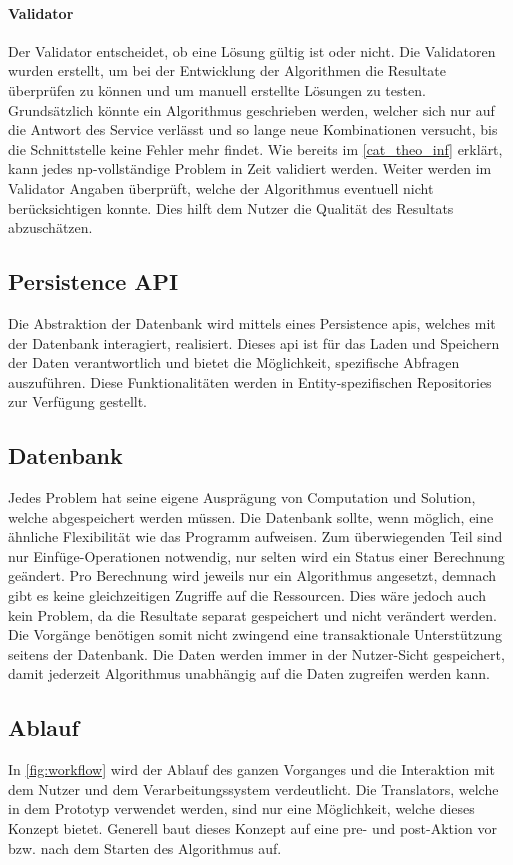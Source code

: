 \paragraph{Validator}
Der Validator entscheidet, ob eine Lösung gültig ist oder nicht. Die Validatoren wurden erstellt, um bei der Entwicklung der Algorithmen die Resultate überprüfen zu können und um manuell 
erstellte Lösungen zu testen. Grundsätzlich könnte ein Algorithmus geschrieben werden, welcher sich nur auf die Antwort des Service verlässt und so lange neue Kombinationen versucht, 
bis die Schnittstelle keine Fehler mehr findet. Wie bereits im \autoref{cat_theo_inf} erklärt, kann jedes \gls{np}-vollständige Problem in  Zeit validiert 
werden. Weiter werden im Validator Angaben überprüft, welche der Algorithmus eventuell nicht berücksichtigen konnte. Dies hilft dem Nutzer die Qualität des Resultats abzuschätzen.

\subsection{Persistence API}
Die Abstraktion der Datenbank wird mittels eines Persistence \glspl{api}, welches mit der Datenbank interagiert, realisiert. Dieses \gls{api} ist für das Laden und Speichern der Daten 
verantwortlich und bietet die Möglichkeit, spezifische Abfragen auszuführen. Diese Funktionalitäten werden in Entity-spezifischen Repositories zur Verfügung gestellt.

\subsection{Datenbank}
Jedes Problem hat seine eigene Ausprägung von Computation und Solution, welche abgespeichert werden müssen. Die Datenbank sollte, wenn möglich, eine ähnliche Flexibilität wie 
das Programm aufweisen. Zum überwiegenden Teil sind nur Einfüge-Operationen notwendig, nur selten wird ein Status einer Berechnung geändert. Pro Berechnung wird jeweils nur ein 
Algorithmus angesetzt, demnach gibt es keine gleichzeitigen Zugriffe auf die Ressourcen. Dies wäre jedoch auch kein Problem, da die Resultate separat gespeichert und nicht verändert 
werden. Die Vorgänge benötigen somit nicht zwingend eine transaktionale Unterstützung seitens der Datenbank. Die Daten werden immer in der Nutzer-Sicht gespeichert, damit jederzeit 
Algorithmus unabhängig auf die Daten zugreifen werden kann.

\newpage
\subsection{Ablauf}
In \autoref{fig:workflow} wird der Ablauf des ganzen Vorganges und die Interaktion mit dem Nutzer und dem Verarbeitungssystem verdeutlicht. Die Translators, welche in dem 
Prototyp verwendet werden, sind nur eine Möglichkeit, welche dieses Konzept bietet. Generell baut dieses Konzept auf eine pre- und post-Aktion vor bzw. nach dem Starten des Algorithmus 
auf.

